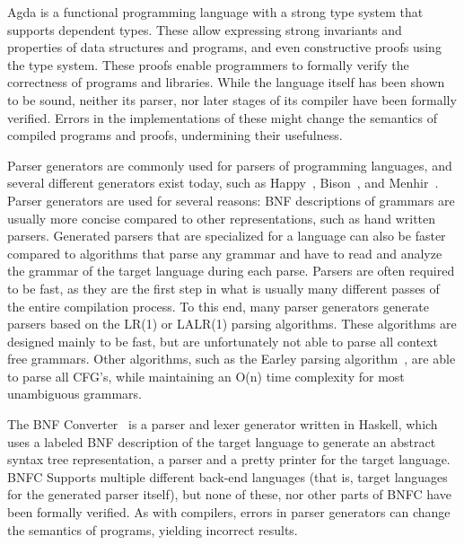\documentclass{article}
\begin{document}
	Agda is a functional programming language with a strong type system that
	supports dependent types. These allow expressing strong invariants and
	properties of data structures and programs, and even constructive proofs
	using the type system. These proofs enable programmers to formally verify
	the correctness of programs and libraries. While the language itself has
	been shown to be sound, neither its parser, nor later stages of its
	compiler have been formally verified. Errors in the implementations of
	these might change the semantics of compiled programs and proofs,
	undermining their usefulness.

	Parser generators are commonly used for parsers of programming languages,
	and several different generators exist today, such as Happy~\cite{Happy},
	Bison~\cite{Bison}, and Menhir~\cite{Menhir}. Parser generators are used
	for several reasons: BNF descriptions of grammars are usually more concise
	compared to other representations, such as hand written parsers. Generated
	parsers that are specialized for a language can also be faster compared to
	algorithms that parse any grammar and have to read and analyze the grammar
	of the target language during each parse. Parsers are often required to be
	fast, as they are the first step in what is usually many different passes
	of the entire compilation process. To this end, many parser generators
	generate parsers based on the LR(1) or LALR(1) parsing algorithms. These
	algorithms are designed mainly to be fast, but are unfortunately not able
	to parse all context free grammars.  Other algorithms, such as the Earley
	parsing algorithm~\cite{Earley}, are able to parse all CFG's, while
	maintaining an O(n) time complexity for most unambiguous grammars.

	The BNF Converter~\cite{BNFC} is a parser and lexer generator written in
	Haskell, which uses a labeled BNF description of the target language to
	generate an abstract syntax tree representation, a parser and a pretty
	printer for the target language. BNFC Supports multiple different back-end
	languages (that is, target languages for the generated parser itself), but
	none of these, nor other parts of BNFC have been formally verified. As with
	compilers, errors in parser generators can change the semantics of
	programs, yielding incorrect results.


\end{document}
